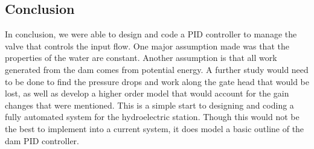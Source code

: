 \documentclass{article}
\begin{document}
\begin{multicols*}{2}
        \section{Conclusion}
        
        In conclusion, we were able to design and code a PID controller to manage the valve that controls the input flow.  One major assumption made was that the properties of the water are constant.  Another assumption is that all work generated from the dam comes from potential energy.  A further study would need to be done to find the pressure drops and work along the gate head that would be lost, as well as develop a higher order model that would account for the gain changes that were mentioned. This is a simple start to designing and coding a fully automated system for the hydroelectric station.  Though this would not be the best to implement into a current system, it does model a basic outline of the dam PID controller.
        
    \end{multicols*}

        \pagebreak
        
\end{document}
